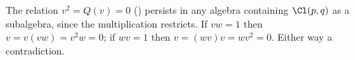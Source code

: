 The relation $v^2 = Q(v) = 0$ () persists in any algebra containing $\Cl(p,q)$ as a subalgebra, since the multiplication restricts. If $vw = 1$ then $v = v(vw) = v^2 w = 0$; if $wv = 1$ then $v = (wv)v = wv^2 = 0$. Either way a contradiction.
